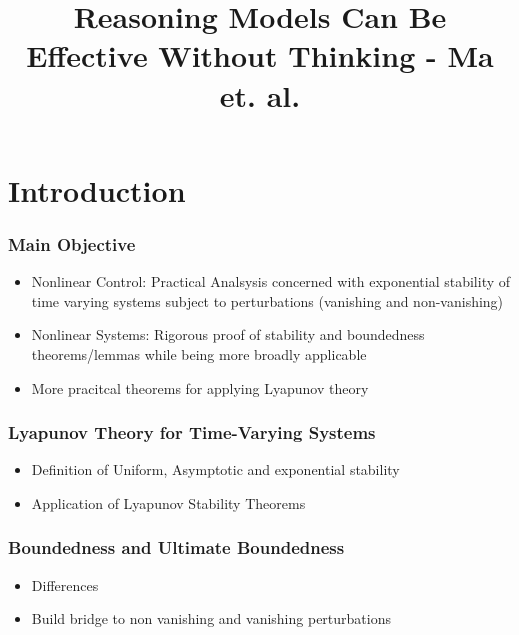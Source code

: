 \documentclass[student, noshadow, lsr, english, aspectratio=169]{ITR_LSR_slides}
\title{Reasoning Models Can Be Effective Without Thinking - Ma et. al.}
\begin{document}
\begin{frame}
    \titlepage
\end{frame}


\section{Introduction}

\begin{frame}
	\frametitle{Main Objective}
	\begin{itemize}
		\item Nonlinear Control: Practical Analsysis concerned with exponential stability of time varying systems subject to perturbations (vanishing and non-vanishing)
		\item Nonlinear Systems: Rigorous proof of stability and boundedness theorems/lemmas while being more broadly applicable
		\item More pracitcal theorems for applying Lyapunov theory
	\end{itemize}
\end{frame}

\begin{frame}
	\frametitle{Lyapunov Theory for Time-Varying Systems}
	\begin{itemize}
		\item Definition of Uniform, Asymptotic and exponential stability \cite{muennighoff_s1_2025}
		\item Application of Lyapunov Stability Theorems
	\end{itemize}
\end{frame}

\begin{frame}
	\frametitle{Boundedness and Ultimate Boundedness}
	\begin{itemize}
		\item Differences
		\item Build bridge to non vanishing and vanishing perturbations
	\end{itemize}
\end{frame}

\end{document}
